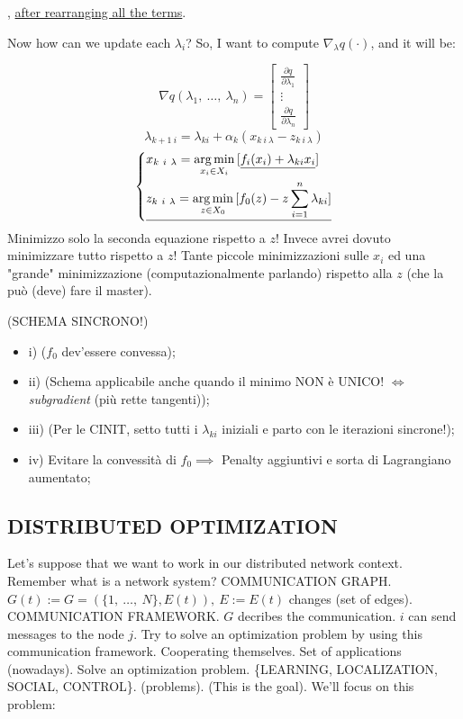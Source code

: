 , \underline{after rearranging all the terms}.

Now how can we update each $\lambda_i$? So, I want to compute $\nabla_\lambda{q(\mathord{\cdot})}$, and it will be:

\[
	\nabla{q(\lambda_1,\ \dots,\ \lambda_n)} = \begin{bmatrix}\frac{\partial{q}}{\partial{\lambda_1}}\\ \vdots\\ \frac{\partial{q}}{\partial{\lambda_n}}\end{bmatrix}
\]
\[	
	\lambda_{k+1\ i} = \lambda_{ki} + \alpha_k(x_{k\ i\ \lambda} - z_{k\ i\ \lambda})
\]
\[
	\left\{
	\begin{aligned}
	&x_{k\ i\ \lambda} = \operatorname*{arg\,min}_{x_i\in X_i}{[\underline{f_i(x_i)+\lambda_{ki}x_i}]}\\
	&\underline{z_{k\ i\ \lambda} = \operatorname*{arg\,min}_{z\in X_0}{[f_0(z) - z\sum_{i=1}^n{\lambda_{ki}}]}}
	\end{aligned}
	\right.
\]
Minimizzo solo la seconda equazione rispetto a $z$! Invece avrei dovuto minimizzare tutto rispetto a $z$! Tante piccole minimizzazioni sulle $x_i$ ed una "grande" minimizzazione (computazionalmente parlando) rispetto alla $z$ (che la può (deve) fare il master).

(SCHEMA SINCRONO!)
\begin{itemize}
\item{i)} ($f_0$ dev'essere convessa);
\item{ii)} (Schema applicabile anche quando il minimo NON è UNICO! $\iff$ \emph{subgradient} (più rette tangenti));
\item{iii)} (Per le CINIT, setto tutti i $\lambda_{ki}$ iniziali e parto con le iterazioni sincrone!); \item{iv)} Evitare la convessità di $f_0 \implies$ Penalty aggiuntivi e sorta di Lagrangiano aumentato;
\end{itemize}

\subsection{DISTRIBUTED OPTIMIZATION}

Let's suppose that we want to work in our distributed network context. Remember what is a network system? COMMUNICATION GRAPH. $G(t) := G = (\{1,\ \dots,\ N\}, E(t)),\ E := E(t)$ changes (set of edges). COMMUNICATION FRAMEWORK. $G$ decribes the communication. $i$ can send messages to the node $j$. Try to solve an optimization problem by using this communication framework. Cooperating themselves. Set of applications (nowadays). Solve an optimization problem. \{LEARNING, LOCALIZATION, SOCIAL, CONTROL\}. (problems). (This is the goal). We'll focus on this problem:

